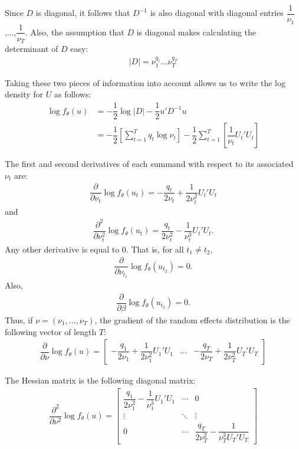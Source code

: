 \documentclass{article}
\begin{document}
Since $D$ is diagonal, it follows that $D^{-1}$ is also diagonal with diagonal entries $\dfrac{1}{\nu_1}$,...,$\dfrac{1}{\nu_T}$.  Also, the assumption that $D$ is diagonal makes calculating the determinant of $D$  easy:
\begin{align}
|D|= \nu_1^{q_1}...\nu_T^{q_T}
\end{align}

 Taking these two pieces of information into account allows us to write the log density for $U$ as follows:
\begin{align}
\log f_\theta(u) &= -\dfrac{1}{2} \log |D| -\dfrac{1}{2} u' D^{-1} u\\
&= -\dfrac{1}{2} \left[  \sum_{t=1}^T q_t \log \nu_t   \right]  -\dfrac{1}{2} \sum_{t=1}^T \left[ \dfrac{1}{\nu_t} U_t'U_t   \right]
\end{align}



The first and second derivatives of each summand with respect to its associated $\nu_t$ are:
\begin{align}
\dfrac{\partial}{\partial \nu_t} \log f_\theta(u_t) = - \dfrac{q_t}{2 \nu_t} + \dfrac{1}{2 \nu_t^2}U_t'U_t
\end{align}
and 
\begin{align}
\dfrac{\partial^2}{\partial \nu_t^2} \log f_\theta(u_t) = \dfrac{q_t}{2 \nu_t^2}- \dfrac{1}{\nu_t^3} U_t'U_t.
\end{align}
Any other derivative is equal to 0. That is, for all $t_1 \neq t_2$,
\begin{align}
\dfrac{\partial}{\partial \nu_{t_1}} \log f_\theta(u_{t_2}) = 0.
\end{align}
Also,
\begin{align}
\dfrac{\partial}{\partial \beta} \log f_\theta(u_{t_2}) = 0.
\end{align}
Thus, if $\nu = (\nu_1,...,\nu_T)$, the gradient of the random effects distribution is the following vector of length $T$:
\begin{align}
\dfrac{\partial}{\partial \nu}  \log f_\theta(u) = \begin{bmatrix} - \dfrac{q_1}{2 \nu_1} + \dfrac{1}{2 \nu_1^2} U_1'U_1 & ... & - \dfrac{q_T}{2 \nu_T} + \dfrac{1}{2 \nu_T^2} U_T'U_T   \end{bmatrix} 
\end{align}

The Hessian matrix is the following diagonal matrix:
\begin{align}
\dfrac{\partial^2}{\partial \nu^2} \log f_\theta(u) = \begin{bmatrix} \dfrac{q_1}{2 \nu_1^2}- \dfrac{1}{\nu_1^3} U_1'U_1 & \cdots & 0 \\ \vdots & \ddots & \vdots \\ 0 & \cdots & \dfrac{q_T}{2 \nu_T^2}- \dfrac{1}{\nu_T^3 U_T'U_T} \end{bmatrix}
\end{align}
\end{document}
